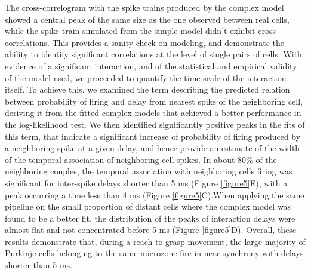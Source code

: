 
The cross-correlogram with the spike trains produced by the complex model showed a central peak of the same size as the one observed between real cells, while the spike train simulated from the simple model didn't exhibit cross-correlations. This provides a sanity-check on modeling, and demonstrate the ability to identify significant correlations at the level of single pairs of cells. With evidence of a significant interaction, and of the statistical and empirical validity of the model used, we proceeded to quantify the time scale of the interaction itself. To achieve this, we examined the term describing the predicted relation between probability of firing and delay from nearest spike of the neighboring cell, deriving it from the fitted complex models that achieved a better performance in the log-likelihood test. We then identified significantly positive peaks in the fits of this term, that indicate a significant increase of probability of firing produced by a neighboring spike at a given delay, and hence provide an estimate of the width of the temporal association of neighboring cell spikes.  In about 80\% of the neighboring couples, the temporal association with neighboring cells firing was significant for inter-spike delays shorter than 5 ms (Figure \ref{figure5}E), with a peak occurring a time less than 4 ms (Figure \ref{figure5}C).When applying the same pipeline on the small proportion of distant cells where the complex model was found to be a better fit, the distribution of the peaks of interaction delays were almost flat and not concentrated before 5 ms (Figure \ref{figure5}D). Overall, these results demonstrate that, during a reach-to-grasp movement, the large majority of Purkinje cells belonging to the same microzone fire in near synchrony with delays shorter than 5 ms.

